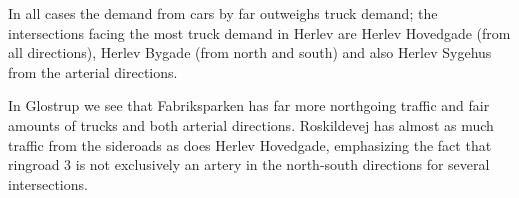 In all cases the demand from cars by far outweighs truck demand; the intersections facing the most truck demand in Herlev are Herlev Hovedgade (from all directions), Herlev Bygade (from north and south) and also Herlev Sygehus from the arterial directions. 

In Glostrup we see that Fabriksparken has far more northgoing traffic and fair amounts of trucks and both arterial directions. Roskildevej has almost as much traffic from the sideroads as does Herlev Hovedgade, emphasizing the fact that ringroad 3 is not exclusively an artery in the north-south directions for several intersections.
